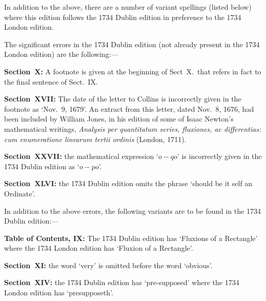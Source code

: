 \smallskip

\noindent
In addition to the above, there are a number of variant spellings
(listed below) where this edition follows the 1734 Dublin edition
in preference to the 1734 London edition.

\bigbreak

The significant errors in the 1734 Dublin edition (not already
present in the 1734 London edition) are the following:---

\smallskip

\item{}
{\bf Section~X:}
A footnote is given at the beginning of Sect~X.\ that refers
in fact to the final sentence of Sect.~IX.

\smallskip

\item{}
{\bf Section~XVII:}
The date of the letter to Collins is incorrectly given
in the footnote as `Nov.~9, 1679'.  An extract from this
letter, dated Nov.~8, 1676, had been included by William
Jones, in his edition of some of Isaac Newton's mathematical
writings, {\it Analysis per quantitatum series, fluxiones,
ac differentias: cum enumeratione linearum tertii ordinis\/}
(London, 1711).

\smallskip

\item{}
{\bf Section~XXVII:}
the mathematical expression `$o - qo$' is incorrectly given
in the 1734 Dublin edition as `$o - po$'.

\smallskip

\item{}
{\bf Section~XLVI:}
the 1734 Dublin edition omits the phrase `should be it self an
Ordinate'.

\vfill\eject

In addition to the above errors, the following variants
are to be found in the 1734 Dublin edition:---

\smallskip

\item{}
{\bf Table of Contents, IX:}
The 1734 Dublin edition has `Fluxions of a Rectangle' where the 
1734 London edition has `Fluxion of a Rectangle'.

\smallskip

\item{}
{\bf Section~XI:}
the word `very' is omitted before the word `obvious'.

\smallskip

\item{}
{\bf Section~XIV:}
the 1734 Dublin edition has `pre-supposed'
where the 1734 London edition has `presupposeth'.


